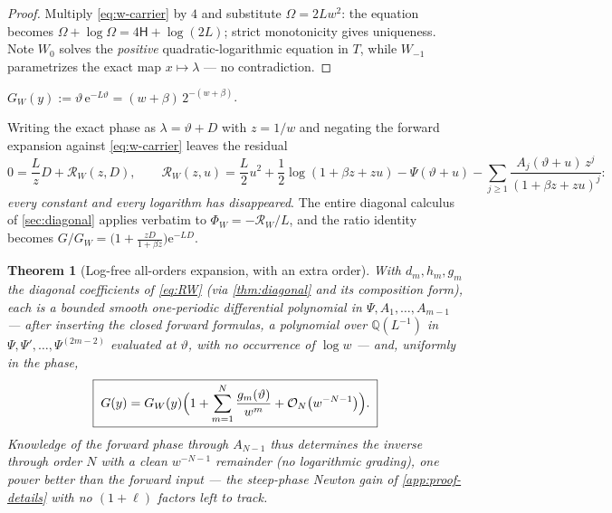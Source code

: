 \documentclass[11pt,oneside]{article}
\numberwithin{equation}{section}
\newtheorem{theorem}{Theorem}[section]
\theoremstyle{definition}
\theoremstyle{remark}
\newcommand{\Q}{\mathbb Q}
\newcommand{\e}{\mathrm e}
\newcommand{\bigO}{\mathcal O}
\newcommand{\LambertW}{W}
\begin{document}
\begin{proof}
Multiply \eqref{eq:w-carrier} by $4$ and substitute
$\Omega=2Lw^{2}$: the equation becomes
$\Omega+\log\Omega=4\mathsf H+\log(2L)$; strict monotonicity gives
uniqueness.  Note $\LambertW_0$ solves the \emph{positive}
quadratic-logarithmic equation in $T$, while $\LambertW_{-1}$
parametrizes the exact map $x\mapsto\lambda$ --- no contradiction.
\end{proof}

\begin{definition}
$G_W(y):=\vartheta\,\e^{-L\vartheta}
=(w+\beta)\,2^{-(w+\beta)}$.
\end{definition}

Writing the exact phase as $\lambda=\vartheta+D$ with $z=1/w$ and
negating the forward expansion against \eqref{eq:w-carrier} leaves the
residual
\begin{equation}
 0=\frac Lz D+\mathcal R_W(z,D),
 \qquad
 \mathcal R_W(z,u)=
 \frac L2u^{2}+\frac12\log(1+\beta z+zu)
 -\Psi(\vartheta+u)
 -\sum_{j\ge1}\frac{A_j(\vartheta+u)\,z^{j}}{(1+\beta z+zu)^{j}}:
 \label{eq:RW}
\end{equation}
\emph{every constant and every logarithm has disappeared}.  The
entire diagonal calculus of \cref{sec:diagonal} applies verbatim to
$\Phi_W=-\mathcal R_W/L$, and the ratio identity becomes
$G/G_W=\bigl(1+\tfrac{zD}{1+\beta z}\bigr)\e^{-LD}$.

\begin{theorem}[Log-free all-orders expansion, with an extra order]
\label{thm:W-all-orders}
With $d_m,h_m,g_m$ the diagonal coefficients of
\eqref{eq:RW} (via \cref{thm:diagonal} and its composition form),
each is a \emph{bounded} smooth one-periodic differential polynomial
in $\Psi,A_1,\dots,A_{m-1}$ --- after inserting the closed forward
formulas, a polynomial over $\Q(L^{-1})$ in
$\Psi,\Psi',\dots,\Psi^{(2m-2)}$ evaluated at $\vartheta$, with no
occurrence of $\log w$ --- and, uniformly in the phase,
\begin{equation}
 \boxed{\;
 G(y)=G_W(y)\Bigl(1+\sum_{m=1}^{N}\frac{g_m(\vartheta)}{w^{m}}
 +\bigO_N\bigl(w^{-N-1}\bigr)\Bigr).
 \;}
 \label{eq:W-expansion}
\end{equation}
Knowledge of the forward phase through $A_{N-1}$ thus determines the
inverse through order $N$ with a \emph{clean} $w^{-N-1}$ remainder
(no logarithmic grading), one power better than the forward input ---
the steep-phase Newton gain of
\cref{app:proof-details} with no $(1+\ell)$ factors left to track.
\end{theorem}
\end{document}
